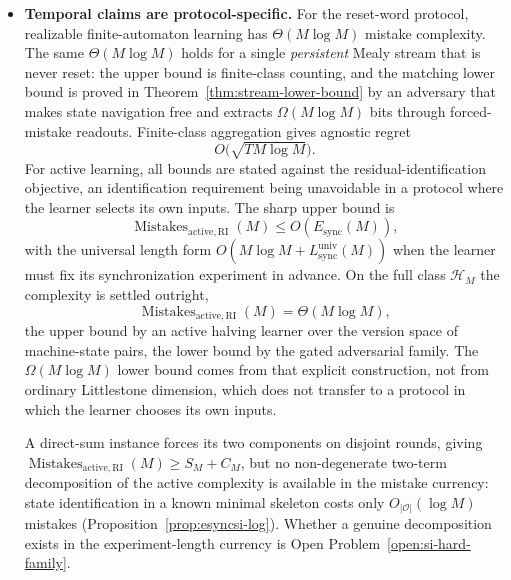 \documentclass[12pt]{article}
\theoremstyle{definition}
\newcommand{\Lsyncu}{L_{\mathrm{sync}}^{\mathrm{univ}}}
\newcommand{\Esync}{E_{\mathrm{sync}}}
\newcommand{\MistRI}{\operatorname{Mistakes}_{\mathrm{active,RI}}}
\begin{document}
\begin{itemize}[leftmargin=1.8em]
\item \textbf{Temporal claims are protocol-specific.}
For the reset-word protocol, realizable finite-automaton learning has
$\Theta(M\log M)$ mistake complexity.  The same $\Theta(M\log M)$ holds for a
single \emph{persistent} Mealy stream that is never reset: the upper bound is
finite-class counting, and the matching lower bound is proved in
Theorem~\ref{thm:stream-lower-bound} by an adversary that makes state
navigation free and extracts $\Omega(M\log M)$ bits through forced-mistake
readouts.  Finite-class aggregation gives agnostic regret
\[
O\bigl(\sqrt{T M\log M}\bigr).
\]
For active learning, all bounds are stated against the residual-identification
objective, an identification requirement being unavoidable in a protocol where
the learner selects its own inputs.  The sharp upper bound is
\[
\MistRI(M)
\le
O(\Esync(M)),
\]
with the universal length form $O(M\log M+\Lsyncu(M))$ when the learner must
fix its synchronization experiment in advance.  On the full class
$\mathcal H_M$ the complexity is settled outright,
\[
\MistRI(M)
=
\Theta(M\log M),
\]
the upper bound by an active halving learner over the version space of
machine-state pairs, the lower bound by the gated adversarial family.  The
$\Omega(M\log M)$ lower bound comes from that explicit construction,
not from ordinary Littlestone dimension, which does not transfer to a protocol
in which the learner chooses its own inputs.

A direct-sum instance forces its two components on disjoint rounds, giving
$\MistRI(M)\ge S_M+C_M$, but no non-degenerate two-term decomposition of the
active complexity is available in the mistake currency: state identification in
a known minimal skeleton costs only $O_{|\mathcal O|}(\log M)$ mistakes
(Proposition~\ref{prop:esyncsi-log}).  Whether a genuine decomposition exists
in the experiment-length currency is
Open Problem~\ref{open:si-hard-family}.


\end{itemize}
\end{document}
